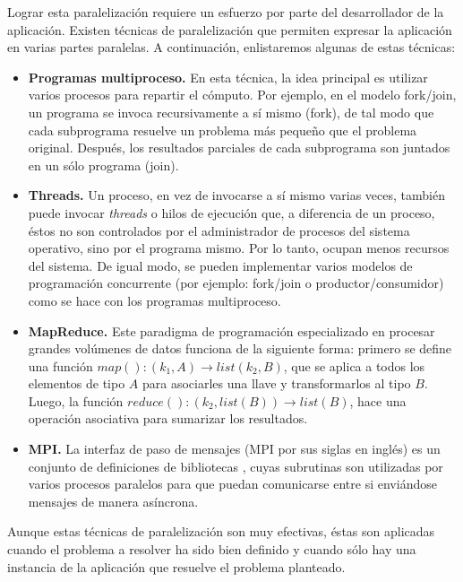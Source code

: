 Lograr esta paralelización requiere un esfuerzo por parte del desarrollador de la aplicación. Existen técnicas de paralelización que permiten expresar la aplicación en varias partes paralelas. A continuación, enlistaremos algunas de estas técnicas:

\begin{itemize}
\item{\textbf{Programas multiproceso.} En esta técnica, la idea principal es utilizar varios procesos para repartir el cómputo. Por ejemplo, en el modelo fork/join, un programa se invoca recursivamente a sí mismo (fork), de tal modo que cada subprograma resuelve un problema más pequeño que el problema original. Después, los resultados parciales de cada subprograma son juntados en un sólo programa (join).}

\item{\textbf{Threads.} Un proceso, en vez de invocarse a sí mismo varias veces, también puede invocar \emph{threads} o hilos de ejecución que, a diferencia de un proceso, éstos no son controlados por el administrador de procesos del sistema operativo, sino por el programa mismo. Por lo tanto, ocupan menos recursos del sistema. De igual modo, se pueden implementar varios modelos de programación concurrente (por ejemplo: fork/join o productor/consumidor) como se hace con los programas multiproceso.}

\item{\textbf{MapReduce.} Este paradigma de programación especializado en procesar grandes volúmenes de datos \cite{dean2008mapreduce} funciona de la siguiente forma: primero se define una función $map(): (k_1,A) \rightarrow list(k_2,B)$, que se aplica a todos los elementos de tipo $A$ para asociarles una llave y transformarlos al tipo $B$. Luego, la función $reduce(): (k_2, list(B)) \rightarrow list(B)$, hace una operación asociativa para sumarizar los resultados.}

\item{\textbf{MPI.} La interfaz de paso de mensajes (MPI por sus siglas en inglés) es un conjunto de definiciones de bibliotecas \cite{lusk2009mpi}, cuyas subrutinas son utilizadas por varios procesos paralelos para que puedan comunicarse entre si enviándose mensajes de manera asíncrona.}
\end{itemize}

Aunque estas técnicas de paralelización son muy efectivas, éstas son aplicadas cuando el problema a resolver ha sido bien definido y cuando sólo hay una instancia de la aplicación que resuelve el problema planteado. 

